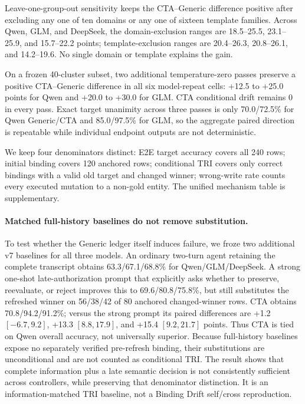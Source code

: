 \documentclass[letterpaper]{article}
\begin{document}
Leave-one-group-out sensitivity keeps the CTA--Generic difference positive after excluding any
one of ten domains or any one of sixteen template families. Across Qwen, GLM, and DeepSeek, the
domain-exclusion ranges are 18.5--25.5, 23.1--25.9, and 15.7--22.2 points; template-exclusion
ranges are 20.4--26.3, 20.8--26.1, and 14.2--19.6. No single domain or template explains the gain.

On a frozen 40-cluster subset, two additional temperature-zero passes preserve a positive
CTA--Generic difference in all six model-repeat cells: +12.5 to +25.0 points for Qwen and
+20.0 to +30.0 for GLM. CTA conditional drift remains 0 in every pass. Exact target unanimity
across three passes is only 70.0/72.5\% for Qwen Generic/CTA and 85.0/97.5\% for GLM, so the
aggregate paired direction is repeatable while individual endpoint outputs are not deterministic.

We keep four denominators distinct: E2E target accuracy covers all 240 rows; initial binding
covers 120 anchored rows; conditional TRI covers only correct bindings with a valid old target and
changed winner; wrong-write rate counts every executed mutation to a non-gold entity. The unified
mechanism table is supplementary.

\paragraph{Matched full-history baselines do not remove substitution.}
To test whether the Generic ledger itself induces failure, we froze two additional v7 baselines
for all three models. An ordinary two-turn agent retaining the complete transcript obtains
63.3/67.1/68.8\% for Qwen/GLM/DeepSeek. A strong one-shot late-authorization prompt that explicitly asks whether to
preserve, reevaluate, or reject improves this to 69.6/80.8/75.8\%, but still substitutes the
refreshed winner on 56/38/42 of 80 anchored changed-winner rows. CTA obtains
70.8/94.2/91.2\%; versus the strong prompt its paired differences are +1.2
$[-6.7,9.2]$, +13.3 $[8.8,17.9]$, and +15.4 $[9.2,21.7]$ points. Thus CTA is tied on Qwen
overall accuracy, not universally superior. Because full-history baselines expose no separately
verified pre-refresh binding, their substitutions are unconditional and are not counted as
conditional TRI. The result shows that complete information plus a late semantic decision is not
consistently sufficient across controllers, while preserving that denominator distinction. It is
an information-matched TRI baseline, not a Binding Drift self/cross reproduction.
\end{document}
